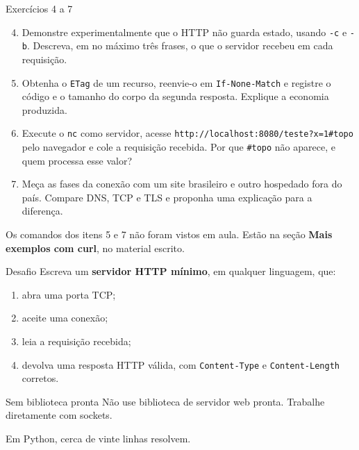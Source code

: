\documentclass{beamer}
\begin{document}
\begin{frame}{Exercícios 4 a 7}
  \begin{enumerate}
    \setcounter{enumi}{3}
    \item Demonstre experimentalmente que o HTTP não guarda estado, usando
          \texttt{-c} e \texttt{-b}. Descreva, em no máximo três frases, o que o
          servidor recebeu em cada requisição.

    \item Obtenha o \texttt{ETag} de um recurso, reenvie-o em
          \texttt{If-None-Match} e registre o código e o tamanho do corpo da
          segunda resposta. Explique a economia produzida.

    \item Execute o \texttt{nc} como servidor, acesse
          \texttt{http://localhost:8080/teste?x=1\#topo} pelo navegador e cole a
          requisição recebida. Por que \texttt{\#topo} não aparece, e quem
          processa esse valor?

    \item Meça as fases da conexão com um site brasileiro e outro hospedado fora
          do país. Compare DNS, TCP e TLS e proponha uma explicação para a
          diferença.
  \end{enumerate}

  \vspace{0.2cm}
  \footnotesize
  Os comandos dos itens 5 e 7 não foram vistos em aula. Estão na seção
  \textbf{Mais exemplos com curl}, no material escrito.
\end{frame}

\begin{frame}{Desafio}
  Escreva um \textbf{servidor HTTP mínimo}, em qualquer linguagem, que:

  \begin{enumerate}
    \item abra uma porta TCP;
    \item aceite uma conexão;
    \item leia a requisição recebida;
    \item devolva uma resposta HTTP válida, com \texttt{Content-Type} e
          \texttt{Content-Length} corretos.
  \end{enumerate}

  \vspace{0.4cm}
  \begin{alertblock}{Sem biblioteca pronta}
    Não use biblioteca de servidor web pronta. Trabalhe diretamente com sockets.
  \end{alertblock}

  \vspace{0.2cm}
  Em Python, cerca de vinte linhas resolvem.
\end{frame}
\end{document}
